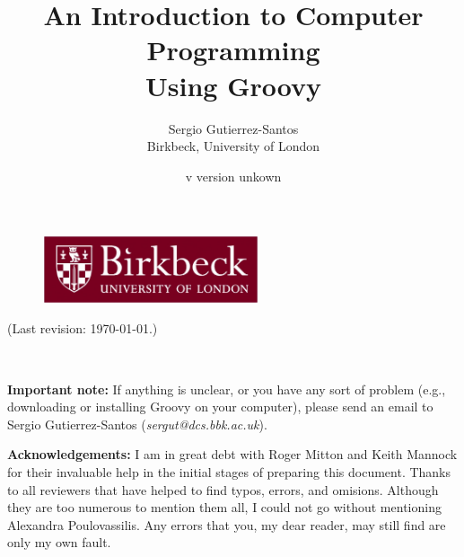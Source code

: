 \documentclass[11pt,a4paper]{article}
\title{An Introduction to Computer Programming\\
  Using Groovy} %
\author{Sergio Gutierrez-Santos\\
  Birkbeck, University of London}
\date{\InputIfFileExists{version.txt}
     {v}
     {version unkown}} %
\begin{document}

\maketitle

\thispagestyle{empty}

\vfill 

\begin{figure}[h!]  %
  \centering
  \includegraphics[height=2cm]{bbk.eps}
\end{figure}

\vfill



\noindent (Last revision: \today.)


\newpage

~\vspace{8cm}

\textbf{Important note: } If anything is unclear, or you have any 
sort of problem (e.g.,
downloading or installing Groovy on your computer), please send an
email to Sergio Gutierrez-Santos (\emph{sergut@dcs.bbk.ac.uk}).

\textbf{Acknowledgements: } I am in great debt with Roger Mitton and
Keith Mannock for their invaluable help in the initial stages of
preparing this document. Thanks to all reviewers that have helped to
find typos, errors, and omisions. Although they are too numerous to
mention them all, I could not go without mentioning Alexandra
Poulovassilis. Any errors that you, my dear reader, may still find are
only my own fault. \newpage


\newpage


\newpage


\newpage


\newpage


\newpage
\end{document}
